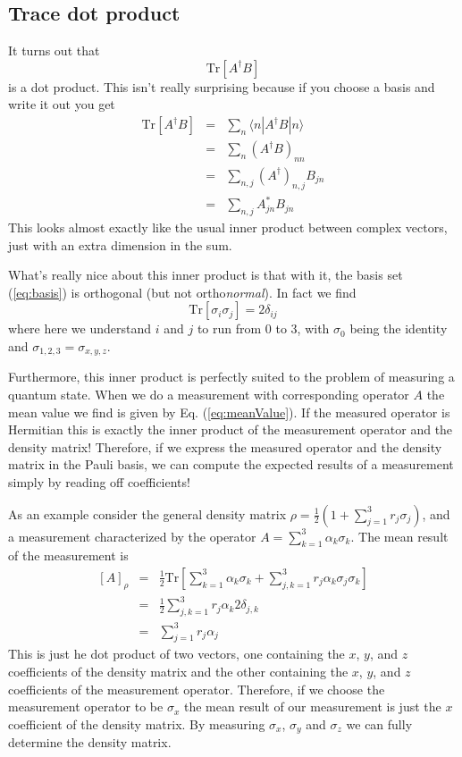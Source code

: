 \documentclass[twocolumn]{article}
\newcommand{\braket}[2]{\langle #1|#2\rangle}
\begin{document}
\subsection{Trace dot product}

It turns out that \begin{equation}
\textrm{Tr} \left[ A^{\dagger}B \right] \end{equation}
is a dot product. This isn't really surprising because if you choose a basis and write it out you get \begin{eqnarray}
\textrm{Tr} \left[ A^{\dagger} B \right] &=& \sum_n \braket{n}{A^{\dagger}B|n} \\ 
&=& \sum_n (A^{\dagger}B)_{nn} \\
&=& \sum_{n,j} (A^{\dagger})_{n,j}B_{jn} \\
&=& \sum_{n,j} A_{jn}^* B_{jn} \end{eqnarray}
This looks almost exactly like the usual inner product between complex vectors, just with an extra dimension in the sum.

What's really nice about this inner product is that with it, the basis set (\ref{eq:basis}) is orthogonal (but not ortho\emph{normal}). In fact we find \begin{equation}
\textrm{Tr} \left[ \sigma_i \sigma_j \right] = 2 \delta_{ij} \end{equation}
where here we understand $i$ and $j$ to run from 0 to 3, with $\sigma_0$ being the identity and $\sigma_{1,2,3} = \sigma_{x,y,z}$.

Furthermore, this inner product is perfectly suited to the problem of measuring a quantum state. When we do a measurement with corresponding operator $A$ the mean value we find is given by Eq. (\ref{eq:meanValue}). If the measured operator is Hermitian this is exactly the inner product of the measurement operator and the density matrix! Therefore, if we express the measured operator and the density matrix in the Pauli basis, we can compute the expected results of a measurement simply by reading off coefficients!

As an example consider the general density matrix $\rho = \frac{1}{2}(1+\sum_{j=1}^3 r_j \sigma_j)$, and a measurement characterized by the operator $A=\sum_{k=1}^3 \alpha_k \sigma_k$. The mean result of the measurement is \begin{eqnarray}
\left[ A \right]_{\rho} &=& \frac{1}{2}\textrm{Tr} \left[\sum_{k=1}^3 \alpha_k \sigma_k + \sum_{j,k=1}^3 r_j \alpha_k \sigma_j \sigma_k \right] \\
&=& \frac{1}{2} \sum_{j,k=1}^3 r_j \alpha_k 2\delta_{j,k} \\
&=& \sum_{j=1}^3 r_j \alpha_j \end{eqnarray}
This is just he dot product of two vectors, one containing the $x$, $y$, and $z$ coefficients of the density matrix and the other containing the $x$, $y$, and $z$ coefficients of the measurement operator. Therefore, if we choose the measurement operator to be $\sigma_x$ the mean result of our measurement is just the $x$ coefficient of the density matrix. By measuring $\sigma_x$, $\sigma_y$ and $\sigma_z$ we can fully determine the density matrix.
\end{document}
